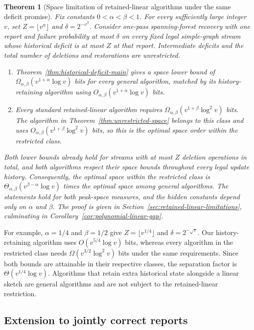 \documentclass[11pt,letterpaper]{article}
\newtheorem{theorem}{Theorem}[section]
\numberwithin{equation}{section}
\begin{document}
\begin{theorem}[Space limitation of retained-linear algorithms under the same deficit promise]
\label{thm:intro-polynomial-linear-gap}
Fix constants $0<\alpha<\beta<1$.
For every sufficiently large integer $v$, set $Z=\lfloor v^\alpha\rfloor$ and $\delta=2^{-v^\beta}$.
Consider one-pass spanning-forest recovery with one report and failure probability at most $\delta$ on every fixed legal simple-graph stream whose historical deficit is at most $Z$ at that report.
Intermediate deficits and the total number of deletions and restorations are unrestricted.
\begin{enumerate}
\item Theorem~\ref{thm:historical-deficit-main} gives a space lower bound of $\Omega_{\alpha,\beta}(v^{1+\alpha}\log v)$ bits for every general algorithm, matched by its history-retaining algorithm using $O_{\alpha,\beta}(v^{1+\alpha}\log v)$ bits.
\item Every standard retained-linear algorithm requires $\Omega_{\alpha,\beta}(v^{1+\beta}\log^2v)$ bits. The algorithm in Theorem~\ref{thm:unrestricted-space} belongs to this class and uses $O_{\alpha,\beta}(v^{1+\beta}\log^2v)$ bits, so this is the optimal space order within the restricted class.
\end{enumerate}
Both lower bounds already hold for streams with at most $Z$ deletion operations in total, and both algorithms respect their space bounds throughout every legal update history.
Consequently, the optimal space within the restricted class is $\Theta_{\alpha,\beta}(v^{\beta-\alpha}\log v)$ times the optimal space among general algorithms.
The statements hold for both peak-space measures, and the hidden constants depend only on $\alpha$ and $\beta$.
The proof is given in Section~\ref{sec:retained-linear-limitations}, culminating in Corollary~\ref{cor:polynomial-linear-gap}.
\end{theorem}

For example, $\alpha=1/4$ and $\beta=1/2$ give $Z=\lfloor v^{1/4}\rfloor$ and $\delta=2^{-\sqrt v}$.
Our history-retaining algorithm uses $O(v^{5/4}\log v)$ bits, whereas every algorithm in the restricted class needs $\Omega(v^{3/2}\log^2v)$ bits under the same requirements.
Since both bounds are attainable in their respective classes, the separation factor is $\Theta(v^{1/4}\log v)$.
Algorithms that retain extra historical state alongside a linear sketch are general algorithms and are not subject to the retained-linear restriction.

\subsection{Extension to jointly correct reports}
\end{document}
